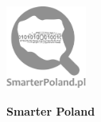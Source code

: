 \documentclass[\main/boa.tex]{subfiles}
\begin{document}
	
	\begin{minipage}[t]{0.915\textwidth}
		\center     
		\includegraphics[width=100px]{img/logos.bw/smarterpoland_logo.png} 
	\end{minipage}
	\begin{center}
	\Large \textbf {Smarter Poland}
	\end{center}
	
	\vskip 0.3cm
	\normalsize 
\vskip 1.5cm
\end{document}
